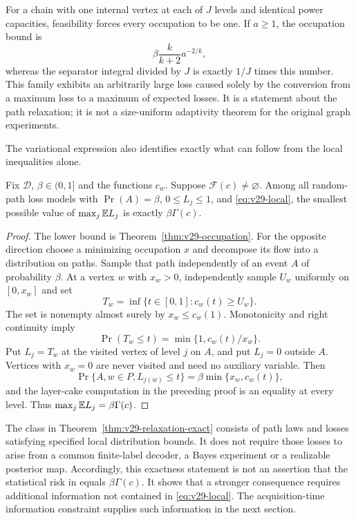 For a chain with one internal vertex at each of $J$ levels and identical
power capacities, feasibility forces every occupation to be one. If
$a\ge1$, the occupation bound is
\[
              \beta\frac{k}{k+2}a^{-2/k},
\]
whereas the separator integral divided by $J$ is exactly $1/J$ times
this number. This family exhibits an arbitrarily large loss caused
solely by the conversion from a maximum loss to a maximum of expected
losses. It is a statement about the path relaxation; it is not a
size-uniform adaptivity theorem for the original graph experiments.

The variational expression also identifies exactly what can follow
from the local inequalities alone.

\begin{theorem}
\label{thm:v29-relaxation-exact}
Fix $\mathscr D$, $\beta\in(0,1]$ and the functions $c_w$. Suppose
$\mathcal F(c)\ne\varnothing$. Among all random-path loss models with
$\Pr(A)=\beta$, $0\le L_j\le1$, and
\eqref{eq:v29-local}, the smallest possible value of
$\max_j\mathbb E L_j$ is exactly $\beta\Gamma(c)$.
\end{theorem}
\begin{proof}
The lower bound is Theorem~\ref{thm:v29-occupation}. For the opposite
direction choose a minimizing occupation $x$ and decompose its flow
into a distribution on paths. Sample that path independently of an
event $A$ of probability $\beta$. At a vertex $w$ with $x_w>0$,
independently sample $U_w$ uniformly on $[0,x_w]$ and set
\[
 T_w=\inf\{t\in[0,1]:c_w(t)\ge U_w\}.
\]
The set is nonempty almost surely by $x_w\le c_w(1)$.
Monotonicity and right continuity imply
\[
 \Pr(T_w\le t)=\min\{1,c_w(t)/x_w\}.
\]
Put $L_j=T_w$ at the visited vertex of level $j$ on $A$, and put
$L_j=0$ outside $A$. Vertices with $x_w=0$ are never visited and
need no auxiliary variable. Then
\[
 \Pr\{A,w\in P,L_{j(w)}\le t\}
                       =\beta\min\{x_w,c_w(t)\},
\]
and the layer-cake computation in the preceding proof is an equality
at every level. Thus $\max_j\mathbb E L_j=\beta\Gamma(c)$.
\end{proof}

The class in Theorem~\ref{thm:v29-relaxation-exact} consists of path
laws and losses satisfying specified local distribution bounds. It does
not require those losses to arise from a common finite-label decoder,
a Bayes experiment or a realizable posterior map. Accordingly, this
exactness statement is not an assertion that the statistical risk in
 equals $\beta\Gamma(c)$.
It shows that a stronger consequence requires additional information
not contained in \eqref{eq:v29-local}. The acquisition-time information
constraint supplies such information in the next section.
